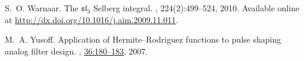\begin{thebibliography}{CMS94}
S.~O. Warnaar.
\newblock The {${\mathfrak{sl}}_3$} {S}elberg integral.
, 224(2):499--524, 2010.
\newblock Available online at
  \url{http://dx.doi.org/10.1016/j.aim.2009.11.011}.

M.~A. Yusoff.
\newblock Application of {H}ermite--{R}odriguez functions to pulse shaping
  analog filter design.
  , \href{
	  http://waset.org/publications/2098/application-of-hermite-rodriguez-functions-to-pulse-shaping-analog-filter-design}
  {36:180--183}, 2007.\\

\end{thebibliography}
